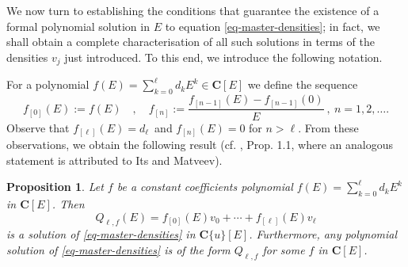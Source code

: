 \documentclass[a4paper,12pt]{article}
\newcommand{\coC}{\mathbf{C}}
\newtheorem{prop}[thm]{Proposition}
\begin{document}
We now turn to establishing the conditions that guarantee the existence of a formal polynomial solution in $E$ to equation \eqref{eq-master-densities}; in fact, we shall obtain a complete characterisation of all such solutions in terms of the densities $v_j$ just introduced. To this end, we introduce the following notation.

For a polynomial $f(E)=\sum_{k=0}^\ell d_k E^k \in \coC[E]$ we define the sequence
\begin{equation}
    f_{[0]}(E) := f(E) \quad , \quad f_{[n]} := \frac{f_{[n-1]} (E)-f_{[n-1]} (0)}{E} \ , \ n=1, 2, \dots .
\end{equation}
Observe that $f_{[\ell]} (E)=d_\ell $\ and $ f_{[n]} (E) =0$ for $n>\ell$. From these observations, we obtain the following result (cf. \cite{gel1979integrable}, Prop. 1.1, where an analogous statement is attributed to Its and Matveev).

\begin{prop}
    Let $f$ be  a constant coefficients polynomial $f(E)=\sum_{k=0}^\ell d_k E^k $ in $\coC[E]$. Then
    \begin{equation}\label{def-Q-ell}
        Q_{\ell , f } (E) = f_{[0]}(E) v_0 +\cdots + f_{[\ell]}(E) v_\ell
    \end{equation}
    is a solution of \eqref{eq-master-densities} in $\coC\{u\}[E]$. Furthermore, any polynomial solution of \eqref{eq-master-densities} is of the form $Q_{\ell , f } $ for some $f  $ in $\coC[E]$.
\end{prop}
\end{document}
